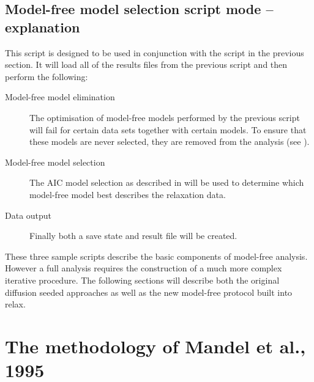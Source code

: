 
\subsection{Model-free model selection script mode -- explanation}

This script is designed to be used in conjunction with the  script in the previous section.
It will load all of the results files from the previous script and then perform the following:
\begin{description}
  \item[Model-free model elimination]  The optimisation of model-free models performed by the previous script will fail for certain data sets together with certain models.
    To ensure that these models are never selected, they are removed from the analysis (see \citet{dAuvergneGooley06}).
  \item[Model-free model selection]  The AIC model selection as described in \citet{dAuvergneGooley03} will be used to determine which model-free model best describes the relaxation data.
  \item[Data output]  Finally both a save state and result file will be created.
\end{description}

These three sample scripts describe the basic components of model-free analysis.
However a full analysis requires the construction of a much more complex iterative procedure.
The following sections will describe both the original diffusion seeded approaches as well as the new model-free protocol built into relax.



\section{The methodology of Mandel et al., 1995}
\label{sect: Mandel 1995}

